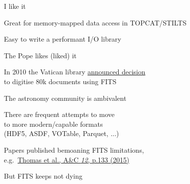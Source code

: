 \documentclass[20pt,landscape]{foils}
\newcommand{\bhref}[2]{\href{#1}{{\color{blue}#2}}}
\begin{document}
\begin{list1}
  \item I like it
  \begin{list2big}
    \item Great for memory-mapped data access in TOPCAT/STILTS
    \item Easy to write a performant I/O library
  \end{list2big}
  \item The Pope likes (liked) it
  \begin{list2big}
    \item In 2010 the Vatican library 
          \bhref{https://www.vaticanlibrary.va/en/the-collections/in-digitalizzation.html}
                {announced decision} \\
          to digitise 80k documents using FITS
  \end{list2big}
  \item The astronomy community is ambivalent
  \begin{list2big}
    \item There are frequent attempts to move \\
          to more modern/capable formats \\
          (HDF5, ASDF, VOTable, Parquet, ...)
    \item Papers published bemoaning FITS limitations,
          \\ e.g.\
          \bhref{https://ui.adsabs.harvard.edu/abs/2015A&C....12..133T}
                {Thomas et al., A\&C {\sl 12}, p.133 (2015)}
    \item But FITS keeps not dying
  \end{list2big}
\end{list1}

\end{document}
